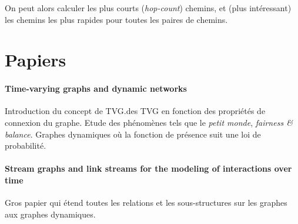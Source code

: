 \documentclass[12pt,a4paper]{article}
\begin{document}
On peut alors calculer les plus courts (\textit{hop-count}) chemins,
et (plus intéressant) les chemins les plus rapides pour toutes les
paires de chemins.

\section{Papiers}

\paragraph{Time-varying graphs and dynamic networks}
Introduction du concept de TVG.\@Classification des TVG en fonction
des propriétés de connexion du graphe. Etude des phénomènes tels que
le \textit{petit monde}, \textit{fairness \& balance}. Graphes
dynamiques où la fonction de présence suit une loi de probabilité.

\paragraph{Stream graphs and link streams for the modeling of
  interactions over time}
Gros papier qui étend toutes les relations et les sous-structures sur
les graphes aux graphes dynamiques.



\end{document}
